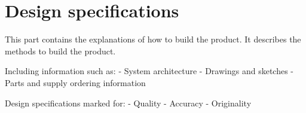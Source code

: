 \documentclass{article}
\begin{document}
\section{Design specifications}
This part contains the explanations of how to build the product. It describes the methods to build the product.

Including information such as:
- System architecture
- Drawings and sketches
- Parts and supply ordering information

Design specifications marked for:
- Quality
- Accuracy
- Originality



% 

% 

% 
\end{document}
